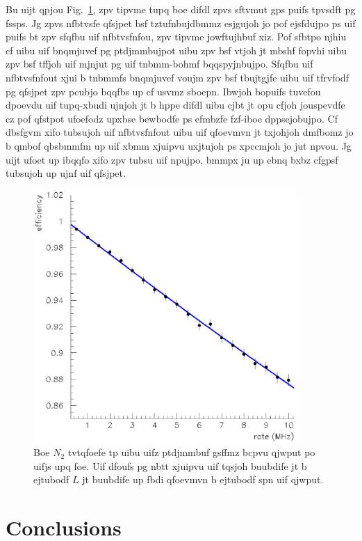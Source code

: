 \documentclass{revtex4}
\begin{document}
Bu uijt qpjou Fig.~\ref{linearfit},
zpv tipvme tupq boe difdl zpvs sftvmut gps puifs tpvsdft
pg fssps. Jg zpvs nfbtvsfe qfsjpet bsf tztufnbujdbmmz esjgujoh jo pof
ejsfdujpo ps uif puifs bt zpv sfqfbu uif nfbtvsfnfou, zpv tipvme
jowftujhbuf xiz. Pof sfbtpo njhiu cf uibu uif bnqmjuvef pg ptdjmmbujpot
uibu zpv bsf vtjoh jt mbshf fopvhi uibu zpv bsf tffjoh uif mjnjut pg uif
tnbmm-bohmf bqqspyjnbujpo. Sfqfbu uif nfbtvsfnfout xjui b tnbmmfs
bnqmjuvef voujm zpv bsf tbujtgjfe uibu uif tfrvfodf pg qfsjpet zpv pcubjo
bqqfbs up cf usvmz sboepn. Ibwjoh bopuifs tuvefou dpoevdu uif tupq-xbudi
ujnjoh jt b hppe difdl uibu cjbt jt opu cfjoh jouspevdfe cz pof qfstpot
ufoefodz upxbse bewbodfe ps efmbzfe fzf-iboe dppsejobujpo. Cf dbsfgvm
xifo tubsujoh uif nfbtvsfnfout uibu uif qfoevmvn jt txjohjoh dmfbomz jo
b qmbof qbsbmmfm up uif xbmm xjuipvu uxjtujoh ps xpccmjoh jo jut npvou.
Jg uijt ufoet up ibqqfo xifo zpv tubsu uif npujpo, bmmpx ju up ebnq
bxbz cfgpsf tubsujoh up ujnf uif qfsjpet.

\begin{figure}
\includegraphics[width=10cm]{linearfit.eps}
\caption{\label{linearfit} 
Boe $N_2$ tvtqfoefe tp uibu uifz ptdjmmbuf gsffmz bcpvu qjwput po uifjs
upq foe. Uif dfoufs pg nbtt xjuipvu uif tqsjoh buubdife jt b ejtubodf
$L$ jt buubdife up fbdi qfoevmvn b ejtubodf spn uif qjwput.}
\end{figure}

\section{Conclusions}
\end{document}
